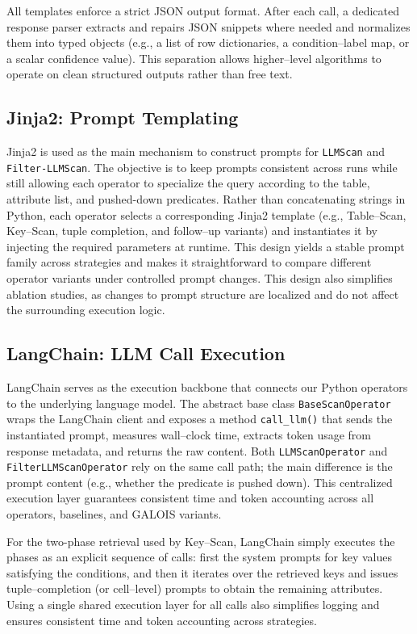 \documentclass[11pt]{article}
\begin{document}
All templates enforce a strict JSON output format. After each call, a dedicated response parser extracts and repairs JSON snippets where needed and normalizes them into typed objects (e.g., a list of row dictionaries, a condition--label map, or a scalar confidence value). This separation allows higher--level algorithms to operate on clean structured outputs rather than free text.

\subsection{Jinja2: Prompt Templating}
Jinja2 is used as the main mechanism to construct prompts for \texttt{LLMScan} and \texttt{Filter-LLMScan}. The objective is to keep prompts consistent across runs while still allowing each operator to specialize the query according to the table, attribute list, and pushed-down predicates. Rather than concatenating strings in Python, each operator selects a corresponding Jinja2 template (e.g., Table--Scan, Key--Scan, tuple completion, and follow--up variants) and instantiates it by injecting the required parameters at runtime. This design yields a stable prompt family across strategies and makes it straightforward to compare different operator variants under controlled prompt changes. This design also simplifies ablation studies, as changes to prompt structure are localized and do not affect the surrounding execution logic.

\subsection{LangChain: LLM Call Execution}
LangChain serves as the execution backbone that connects our Python operators to the underlying language model. The abstract base class \texttt{BaseScanOperator} wraps the LangChain client and exposes a method \texttt{call\_llm()} that sends the instantiated prompt, measures wall--clock time, extracts token usage from response metadata, and returns the raw content. Both \texttt{LLMScanOperator} and \texttt{FilterLLMScanOperator} rely on the same call path; the main difference is the prompt content (e.g., whether the predicate is pushed down). This centralized execution layer guarantees consistent time and token accounting across all operators, baselines, and GALOIS variants.

For the two-phase retrieval used by Key--Scan, LangChain simply executes the phases as an explicit sequence of calls: first the system prompts for key values satisfying the conditions, and then it iterates over the retrieved keys and issues tuple--completion (or cell--level) prompts to obtain the remaining attributes. Using a single shared execution layer for all calls also simplifies logging and ensures consistent time and token accounting across strategies.
\end{document}
